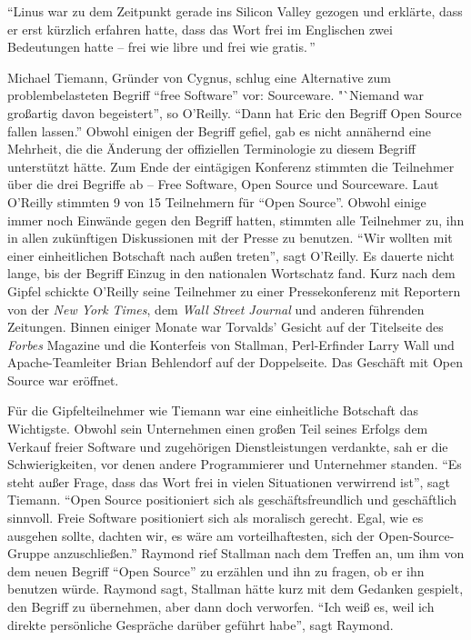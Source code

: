 "`Linus war zu dem Zeitpunkt gerade ins Silicon Valley gezogen und erklärte, dass er erst kürzlich erfahren hatte, dass das Wort \glq frei\grq{} im Englischen zwei Bedeutungen hatte – frei wie \glq libre\grq{} und frei wie \glq gratis\grq.\,"'

Michael Tiemann, Gründer von Cygnus, schlug eine Alternative zum problembelasteten Begriff "`free Software"' vor: Sourceware. "`Niemand war großartig davon begeistert”, so O'Reilly. "`Dann hat Eric den Begriff \glq Open Source\grq{} fallen lassen."' Obwohl einigen der Begriff gefiel, gab es nicht annähernd eine Mehrheit, die die Änderung der offiziellen Terminologie zu diesem Begriff unterstützt hätte. Zum Ende der eintägigen Konferenz stimmten die Teilnehmer über die drei Begriffe ab – Free Software, Open Source und Sourceware. Laut O'Reilly stimmten 9 von 15 Teilnehmern für "`Open Source"'. Obwohl einige immer noch Einwände gegen den Begriff hatten, stimmten alle Teilnehmer zu, ihn in allen zukünftigen Diskussionen mit der Presse zu benutzen. "`Wir wollten mit einer einheitlichen Botschaft nach außen treten"', sagt O'Reilly. Es dauerte nicht lange, bis der Begriff Einzug in den nationalen Wortschatz fand. Kurz nach dem Gipfel schickte O'Reilly seine Teilnehmer zu einer Pressekonferenz mit Reportern von der \textit{New York Times}, dem \textit{Wall Street Journal} und anderen führenden Zeitungen. Binnen einiger Monate war Torvalds' Gesicht auf der Titelseite des \textit{Forbes} Magazine und die Konterfeis von Stallman, Perl-Erfinder Larry Wall und Apache-Teamleiter Brian Behlendorf auf der Doppelseite. Das Geschäft mit Open Source war eröffnet.

Für die Gipfelteilnehmer wie Tiemann war eine einheitliche Botschaft das Wichtigste. Obwohl sein Unternehmen einen großen Teil seines Erfolgs dem Verkauf freier Software und zugehörigen Dienstleistungen verdankte, sah er die Schwierigkeiten, vor denen andere Programmierer und Unternehmer standen.
"`Es steht außer Frage, dass das Wort \glq frei\grq{} in vielen Situationen verwirrend ist"', sagt  Tiemann. "`Open Source positioniert sich als geschäftsfreundlich und geschäftlich sinnvoll. Freie Software positioniert sich als moralisch gerecht. Egal, wie es ausgehen sollte, dachten wir, es wäre am vorteilhaftesten, sich der Open-Source-Gruppe anzuschließen."'
Raymond rief Stallman nach dem Treffen an, um ihm von dem neuen Begriff "`Open Source"' zu erzählen und ihn zu fragen, ob er ihn benutzen würde. Raymond sagt, Stallman hätte kurz mit dem Gedanken gespielt, den Begriff zu übernehmen, aber dann doch verworfen. "`Ich weiß es, weil ich direkte persönliche Gespräche darüber geführt habe"', sagt Raymond. 

